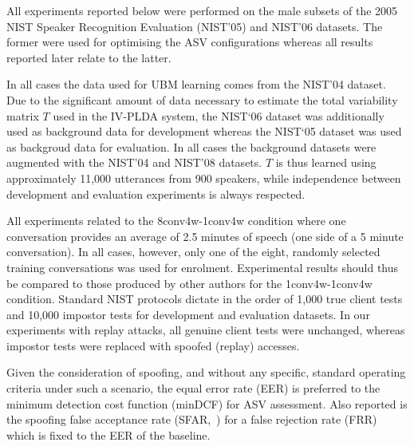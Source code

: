 
All experiments reported below were performed on the male subsets of the 2005 NIST Speaker Recognition Evaluation (NIST'05) and NIST'06 datasets.  
The former were used for optimising the ASV configurations whereas all results reported later relate to the latter.

In all cases the data used for UBM learning comes from the NIST'04 dataset.  Due to the significant amount of data necessary to estimate the total variability matrix $T$ used in the IV-PLDA system, the NIST`06 dataset was additionally used as background data for development whereas the NIST`05 dataset was used as backgroud data for evaluation. 
In all cases the background datasets were augmented with the NIST'04 and NIST'08 datasets.  $T$ is thus learned using approximately 11,000 utterances from 900 speakers, while independence between development and evaluation experiments is always respected.

All experiments related to the 8conv4w-1conv4w condition where one conversation provides an average of 2.5 minutes of speech (one side of a 5 minute conversation).  In all cases, however, only one of the eight, randomly selected training conversations was used for enrolment.  Experimental results should thus be compared to those produced by other authors for the 1conv4w-1conv4w condition. Standard NIST protocols dictate in the order of 1,000 true client tests and 10,000 impostor tests for development and evaluation datasets. In our experiments with replay attacks, all genuine client tests were unchanged, whereas impostor tests were replaced with spoofed (replay) accesses. 

Given the consideration of spoofing, and without any specific, standard operating criteria under such a scenario, the equal error rate (EER) is preferred to the minimum detection cost function (minDCF) for ASV assessment.  Also reported is the spoofing false acceptance rate (SFAR,~\cite{Johnson2010}) for a false rejection rate (FRR) which is fixed to the EER of the baseline.  

